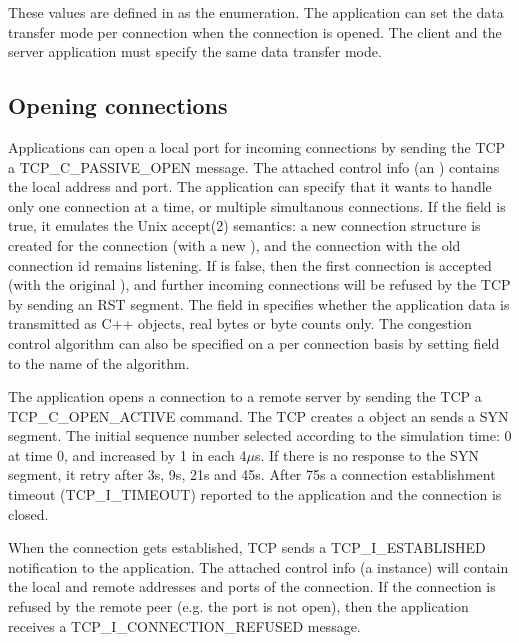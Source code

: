 These values are defined in  as
the  enumeration. The application
can set the data transfer mode per connection when the connection
is opened. The client and the server application must specify
the same data transfer mode.


\subsection{Opening connections}

Applications can open a local port for incoming connections by sending
the TCP a TCP\_C\_PASSIVE\_OPEN message. The attached control info
(an ) contains the local address and port.
The application can specify that it wants to handle
only one connection at a time, or multiple simultanous connections. If the
 field is true, it emulates the Unix accept(2) semantics: a new
connection structure is created for the connection (with a new ),
and the connection with the old connection id remains listening.
If  is false, then the first connection is accepted
(with the original ),
and further incoming connections will be refused by the TCP by sending an RST segment.
The  field in  specifies
whether the application data is transmitted as C++ objects, real bytes or byte
counts only. The congestion control algorithm can also be specified
on a per connection basis by setting  field to the
name of the algorithm.

The application opens a connection to a remote server by sending the TCP
a TCP\_C\_OPEN\_ACTIVE command. The TCP creates a 
object an sends a SYN segment. The initial sequence number selected according
to the simulation time: 0 at time 0, and increased by 1 in each 4$\mu$s.
If there is no response to the SYN segment, it retry after 3s, 9s, 21s and
45s. After 75s a connection establishment timeout (TCP\_I\_TIMEOUT) reported
to the application and the connection is closed.

When the connection gets established, TCP sends a TCP\_I\_ESTABLISHED
notification to the application. The attached control info
(a  instance)
will contain the local and remote addresses and ports of the connection.
If the connection is refused by the remote peer (e.g. the port is not open),
then the application receives a TCP\_I\_CONNECTION\_REFUSED message.

